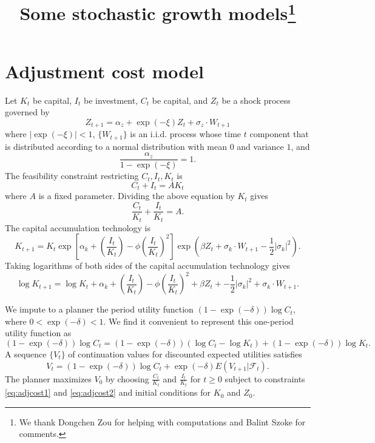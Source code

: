 \documentclass[12pt]{article}
\begin{document}
\title{Some stochastic growth models\footnote{We thank Dongchen Zou for helping with  computations and Balint Szoke for comments.}}

\maketitle




\section{Adjustment cost model}
Let $K_t$ be capital, $I_t$ be investment, $C_t$ be capital, and $Z_t$ be a shock process governed by
\[
Z_{t+1} = \alpha_z + \exp\left( - \xi \right)Z_t + \sigma_z \cdot W_{t+1}
\]
where $|\exp(-\xi)| < 1$, $\{W_{t+1}\}$ is an i.i.d. process whose time $t$ component that is distributed according to a normal distribution with
mean  $0$ and variance $1$, and
\[\frac{\alpha_z}{ 1 - \exp(-\xi)} = 1 .   \]
The feasibility constraint restricting $C_t, I_t, K_t$ is
\[
C_t + I_t = A K_t
\]
where $A$ is a fixed parameter.
Dividing the above equation by $K_t$ gives
\begin{equation}\label{eq:adjcost2}
{\frac {C_t}{K_t}} + {\frac {I_t}{K_t}} = A .
\end{equation}
  The capital accumulation technology is
\[
K_{t+1} = K_t \exp\left[\alpha_k +  \left(\frac {I_t}{K_t}\right)  - \phi \left( \frac {I_t}{K_t} \right)^2 \right] \exp\left( \beta Z_t +
\sigma_k \cdot W_{t+1} - {\frac 1 2} | \sigma_k|^2 \right) .
\]
Taking logarithms of both sides of the capital accumulation technology  gives
\begin{equation}\label{eq:adjcost1}
\log K_{t+1} = \log K_t + \alpha_k + \left(\frac {I_t}{K_t}\right)  - \phi \left( \frac {I_t}{K_t} \right)^2 + \beta Z_t +
- {\frac 1 2} | \sigma_k|^2 + \sigma_k \cdot W_{t+1} .
\end{equation}

We impute to a planner  the period utility function $(1-\exp(-\delta)) \log C_t$, where $0 < \exp(-\delta) < 1$. We find it convenient to represent
this one-period utility function as %
\[
(1 - \exp(-\delta)) \log C_t = (1 - \exp(-\delta)) \left( \log C_t - \log K_t \right) + (1 - \exp(-\delta)) \log K_t .
\]
 A sequence $\{V_t\}$  of  continuation values for  discounted expected utilities
 satisfies
 \[
V_t = (1 - \exp(-\delta)) \log C_t + \exp(-\delta) E\left(V_{t+1} \vert {\mathcal F}_t \right) .
\]
The planner maximizes $V_0$ by choosing 
$ {\frac {C_t}{K_t}}$ and $ {\frac {I_t}{K_t}}$ for $t \geq 0$ 
 subject to constraints  \eqref{eq:adjcost1} and \eqref{eq:adjcost2} and initial conditions for $K_0$ and $Z_0$.
 
\end{document}
